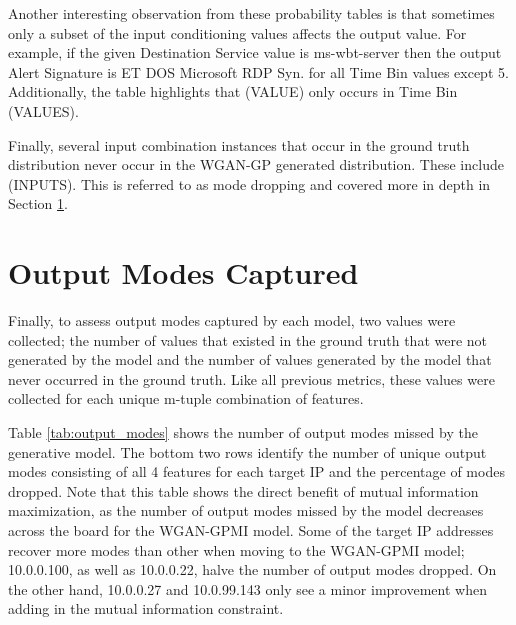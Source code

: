 Another interesting observation from these probability tables is that sometimes only a subset of the input conditioning values affects the output value. For example, if the given Destination Service value is ms-wbt-server then the output Alert Signature is ET DOS Microsoft RDP Syn. for all Time Bin values except 5. Additionally, the table highlights that (VALUE) only occurs in Time Bin (VALUES).

Finally, several input combination instances that occur in the ground truth distribution never occur in the WGAN-GP generated distribution. These include (INPUTS). This is referred to as mode dropping and covered more in depth in Section \ref{sec:output}.

\section{Output Modes Captured}
\label{sec:output}
Finally, to assess output modes captured by each model, two values were collected; the number of values that existed in the ground truth that were not generated by the model and the number of values generated by the model that never occurred in the ground truth. Like all previous metrics, these values were collected for each unique m-tuple combination of features.

Table \ref{tab:output_modes} shows the number of output modes missed by the generative model. The bottom two rows identify the number of unique output modes consisting of all 4 features for each target IP and the percentage of modes dropped.  Note that this table shows the direct benefit of mutual information maximization, as the number of output modes missed by the model decreases across the board for the WGAN-GPMI model. Some of the target IP addresses recover more modes than other when moving to the WGAN-GPMI model; 10.0.0.100, as well as 10.0.0.22,  halve the number of output modes dropped. On the other hand, 10.0.0.27 and 10.0.99.143 only see a minor improvement when adding in the mutual information constraint.


